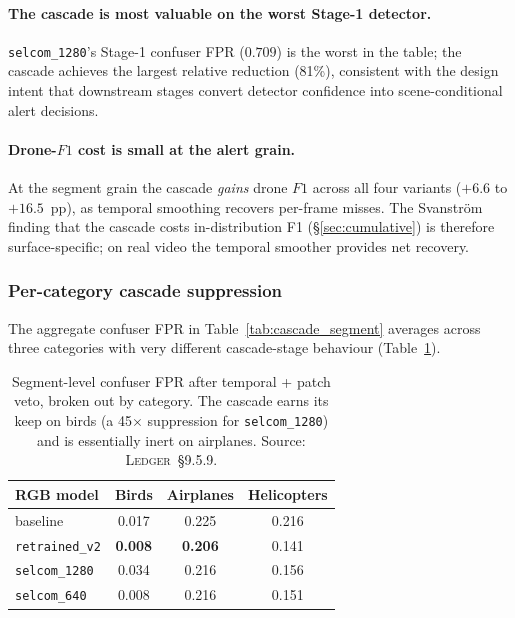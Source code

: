 \paragraph{The cascade is most valuable on the worst Stage-1 detector.}
\texttt{selcom\_1280}'s Stage-1 confuser FPR ($0.709$) is the worst in the table; the cascade achieves the largest relative reduction (81\%), consistent with the design intent that downstream stages convert detector confidence into scene-conditional alert decisions.

\paragraph{Drone-$F1$ cost is small at the alert grain.}
At the segment grain the cascade \emph{gains} drone $F1$ across all four variants ($+6.6$ to $+16.5$~pp), as temporal smoothing recovers per-frame misses. The Svanstr\"om finding that the cascade costs in-distribution F1 (\S\ref{sec:cumulative}) is therefore surface-specific; on real video the temporal smoother provides net recovery.

\subsubsection{Per-category cascade suppression}
\label{sec:realvideo_percategory}

The aggregate confuser FPR in Table~\ref{tab:cascade_segment} averages across three categories with very different cascade-stage behaviour (Table~\ref{tab:cascade_percategory}).

\begin{table}[htbp]
    \centering
    \caption{Segment-level confuser FPR after temporal + patch veto, broken out by category. The cascade earns its keep on birds (a 45$\times$ suppression for \texttt{selcom\_1280}) and is essentially inert on airplanes. Source: \textsc{Ledger}~\S9.5.9.}
    \label{tab:cascade_percategory}
    \begin{tabular}{lccc}
        \toprule
        RGB model & Birds & Airplanes & Helicopters \\
        \midrule
        baseline           & 0.017 & 0.225 & 0.216 \\
        \texttt{retrained\_v2} & \textbf{0.008} & \textbf{0.206} & 0.141 \\
        \texttt{selcom\_1280}  & 0.034 & 0.216 & 0.156 \\
        \texttt{selcom\_640}   & 0.008 & 0.216 & 0.151 \\
        \bottomrule
    \end{tabular}
\end{table}

